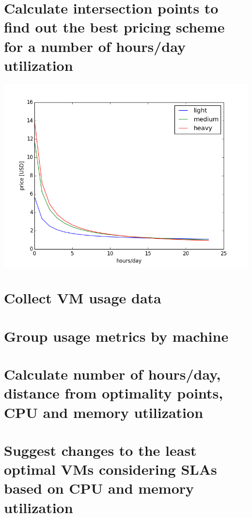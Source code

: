 \documentclass[]{final_report}
\begin{document}
\section{Calculate intersection points to find out the best pricing scheme for a number of hours/day utilization}
\includegraphics[width=\linewidth]{cph}
\section{Collect VM usage data}
\section{Group usage metrics by machine}
\section{Calculate number of hours/day, distance from optimality points, CPU and memory utilization}
\section{Suggest changes to the least optimal VMs considering SLAs based on CPU and memory utilization}




\end{document}

